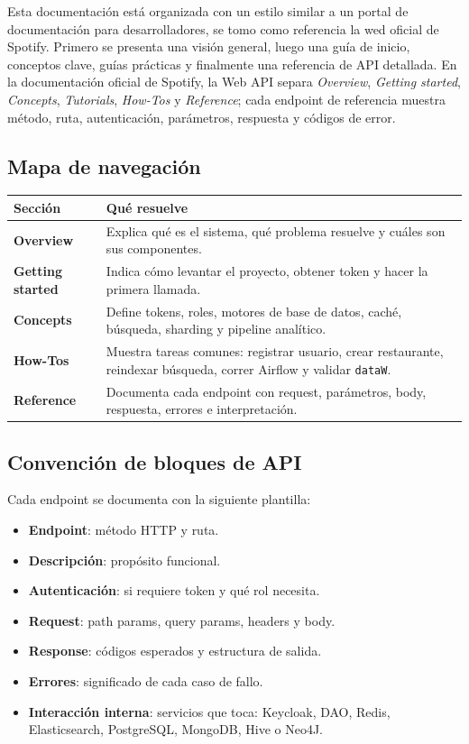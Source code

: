 \documentclass[12pt,letterpaper]{article}
\def\codefile#1{\nolinkurl{#1}}
\begin{document}
Esta documentación está organizada con un estilo similar a un portal de documentación para desarrolladores, se tomo como referencia la wed oficial de Spotify. Primero se presenta una visión general, luego una guía de inicio, conceptos clave, guías prácticas y finalmente una referencia de API detallada. En la documentación oficial de Spotify, la Web API separa \textit{Overview}, \textit{Getting started}, \textit{Concepts}, \textit{Tutorials}, \textit{How-Tos} y \textit{Reference}; cada endpoint de referencia muestra método, ruta, autenticación, parámetros, respuesta y códigos de error.

\subsection{Mapa de navegación}

\begin{longtable}{p{}p{}}
\toprule
\textbf{Sección} & \textbf{Qué resuelve}\\
\midrule
\textbf{Overview} & Explica qué es el sistema, qué problema resuelve y cuáles son sus componentes.\\
\textbf{Getting started} & Indica cómo levantar el proyecto, obtener token y hacer la primera llamada.\\
\textbf{Concepts} & Define tokens, roles, motores de base de datos, caché, búsqueda, sharding y pipeline analítico.\\
\textbf{How-Tos} & Muestra tareas comunes: registrar usuario, crear restaurante, reindexar búsqueda, correr Airflow y validar \codefile{dataW}.\\
\textbf{Reference} & Documenta cada endpoint con request, parámetros, body, respuesta, errores e interpretación.\\
\bottomrule
\end{longtable}

\subsection{Convención de bloques de API}

Cada endpoint se documenta con la siguiente plantilla:

\begin{itemize}
    \item \textbf{Endpoint}: método HTTP y ruta.
    \item \textbf{Descripción}: propósito funcional.
    \item \textbf{Autenticación}: si requiere token y qué rol necesita.
    \item \textbf{Request}: path params, query params, headers y body.
    \item \textbf{Response}: códigos esperados y estructura de salida.
    \item \textbf{Errores}: significado de cada caso de fallo.
    \item \textbf{Interacción interna}: servicios que toca: Keycloak, DAO, Redis, Elasticsearch, PostgreSQL, MongoDB, Hive o Neo4J.
\end{itemize}
\end{document}
